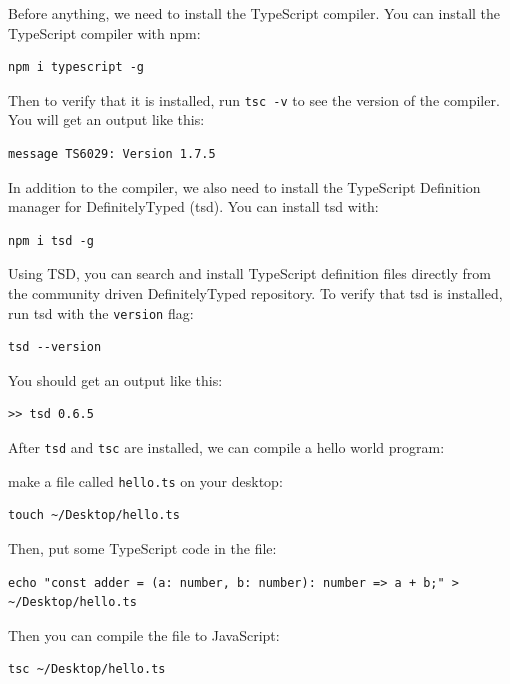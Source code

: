 \documentclass[12pt,]{article}
\begin{document}
Before anything, we need to install the TypeScript compiler. You can
install the TypeScript compiler with npm:

\begin{verbatim}
npm i typescript -g
\end{verbatim}

Then to verify that it is installed, run \texttt{tsc\ -v} to see the
version of the compiler. You will get an output like this:

\begin{verbatim}
message TS6029: Version 1.7.5
\end{verbatim}

In addition to the compiler, we also need to install the TypeScript
Definition manager for DefinitelyTyped (tsd). You can install tsd with:

\begin{verbatim}
npm i tsd -g
\end{verbatim}

Using TSD, you can search and install TypeScript definition files
directly from the community driven DefinitelyTyped repository. To verify
that tsd is installed, run tsd with the \texttt{version} flag:

\begin{verbatim}
tsd --version
\end{verbatim}

You should get an output like this:

\begin{verbatim}
>> tsd 0.6.5
\end{verbatim}

After \texttt{tsd} and \texttt{tsc} are installed, we can compile a
hello world program:

make a file called \texttt{hello.ts} on your desktop:

\begin{verbatim}
touch ~/Desktop/hello.ts
\end{verbatim}

Then, put some TypeScript code in the file:

\begin{verbatim}
echo "const adder = (a: number, b: number): number => a + b;" > ~/Desktop/hello.ts
\end{verbatim}

Then you can compile the file to JavaScript:

\begin{verbatim}
tsc ~/Desktop/hello.ts
\end{verbatim}
\end{document}
